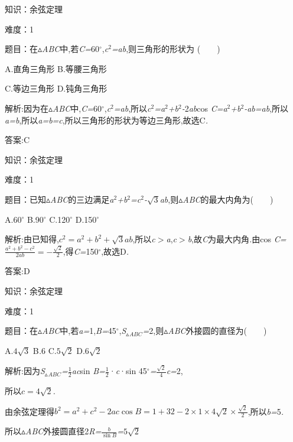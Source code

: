 \documentclass{article} %
\begin{document}
知识：余弦定理

难度：1

 题目：在$\mathrm{\vartriangle}$\textit{ABC}中,若\textit{C=}60$\mathrm{{}^\circ}$,\textit{c}${}^{2}$\textit{=ab},则三角形的形状为 (\textit{　　})

 A.直角三角形 B.等腰三角形

 C.等边三角形 D.钝角三角形

 解析:因为在$\mathrm{\vartriangle}$\textit{ABC}中,\textit{C=}60$\mathrm{{}^\circ}$,\textit{c}${}^{2}$\textit{=ab},所以\textit{c}${}^{2}$\textit{=a}${}^{2}$\textit{+b}${}^{2}$\textit{-}2\textit{ab}cos \textit{C=a}${}^{2}$\textit{+b}${}^{2}$\textit{-ab=ab},所以\textit{a=b},所以\textit{a=b=c},所以三角形的形状为等边三角形,故选C\textit{.}

 答案:C

知识：余弦定理

难度：1

 题目：已知$\mathrm{\vartriangle}$\textit{ABC}的三边满足\textit{a}${}^{2}$\textit{+b}${}^{2}$\textit{=c}${}^{2}$\textit{-}$\sqrt{3}$\textit{ab},则$\mathrm{\vartriangle}$\textit{ABC}的最大内角为(\textit{　　})

 A.60$\mathrm{{}^\circ}$ B.90$\mathrm{{}^\circ}$ C.120$\mathrm{{}^\circ}$ D.150$\mathrm{{}^\circ}$

 解析:由已知得,$c^2=a^2+b^2+\sqrt{3}ab$,所以\textit{c$>$a},\textit{c$>$b},故\textit{C}为最大内角\textit{.}由cos \textit{C=}$\frac{a^2+b^2-c^2}{2ab}=-\frac{\sqrt{2}}{2}$,得\textit{C=}150\textit{${}^\circ$},故选D\textit{.}

 答案:D

知识：余弦定理

难度：1

 题目：在$\mathrm{\vartriangle}$\textit{ABC}中,若\textit{a=}1,\textit{B=}45$\mathrm{{}^\circ}$,\textit{S}${}_{\vartriangle }$\textit{${}_{ABC}$=}2,则$\mathrm{\vartriangle}$\textit{ABC}外接圆的直径为(\textit{　　})

 A.$4\sqrt{3}$ B\textit{.}6 C.$5\sqrt{2}$ D.$6\sqrt{2}$

 解析:因为\textit{S}${}_{\vartriangle }$\textit{${}_{ABC}$=}$\frac{1}{2}$\textit{ac}sin \textit{B=}$\frac{1}{2}$·\textit{c}·sin 45$\mathrm{{}^\circ}$\textit{=}$\frac{\sqrt{2}}{4}$\textit{c=}2,

所以$c=4\sqrt{2}$\textit{.}

由余弦定理得$b^2=a^2+c^2-2ac\cos B=1+32-2\times 1\times4\sqrt{2}\times\frac{\sqrt{2}}{2}$,所以\textit{b=}5\textit{.}

所以$\mathrm{\vartriangle}$\textit{ABC}外接圆直径2\textit{R=}$\frac{b}{\sin B}$\textit{=}$5\sqrt{2}$
\end{document}
